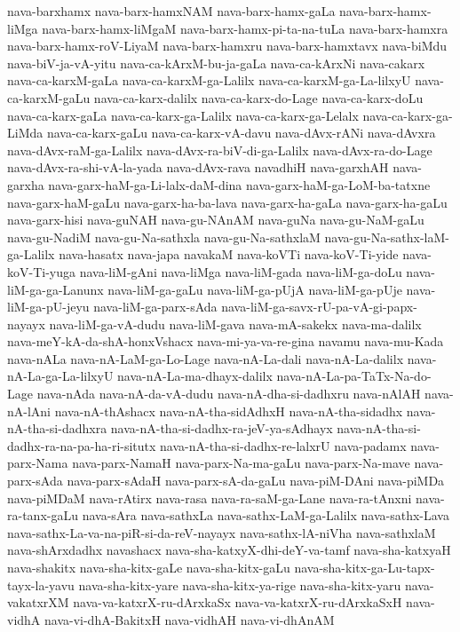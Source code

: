 {nava-barxhamx
nava-barx-hamxNAM
nava-barx-hamx-gaLa
nava-barx-hamx-liMga
nava-barx-hamx-liMgaM
nava-barx-hamx-pi-ta-na-tuLa
nava-barx-hamxra
nava-barx-hamx-roV-LiyaM
nava-barx-hamxru
nava-barx-hamxtavx
nava-biMdu
nava-biV-ja-vA-yitu
nava-ca-kArxM-bu-ja-gaLa
nava-ca-kArxNi
nava-cakarx
nava-ca-karxM-gaLa
nava-ca-karxM-ga-Lalilx
nava-ca-karxM-ga-La-lilxyU
nava-ca-karxM-gaLu
nava-ca-karx-dalilx
nava-ca-karx-do-Lage
nava-ca-karx-doLu
nava-ca-karx-gaLa
nava-ca-karx-ga-Lalilx
nava-ca-karx-ga-Lelalx
nava-ca-karx-ga-LiMda
nava-ca-karx-gaLu
nava-ca-karx-vA-davu
nava-dAvx-rANi
nava-dAvxra
nava-dAvx-raM-ga-Lalilx
nava-dAvx-ra-biV-di-ga-Lalilx
nava-dAvx-ra-do-Lage
nava-dAvx-ra-shi-vA-la-yada
nava-dAvx-rava
navadhiH
nava-garxhAH
nava-garxha
nava-garx-haM-ga-Li-lalx-daM-dina
nava-garx-haM-ga-LoM-ba-tatxne
nava-garx-haM-gaLu
nava-garx-ha-ba-lava
nava-garx-ha-gaLa
nava-garx-ha-gaLu
nava-garx-hisi
nava-guNAH
nava-gu-NAnAM
nava-guNa
nava-gu-NaM-gaLu
nava-gu-NadiM
nava-gu-Na-sathxla
nava-gu-Na-sathxlaM
nava-gu-Na-sathx-laM-ga-Lalilx
nava-hasatx
nava-japa
navakaM
nava-koVTi
nava-koV-Ti-yide
nava-koV-Ti-yuga
nava-liM-gAni
nava-liMga
nava-liM-gada
nava-liM-ga-doLu
nava-liM-ga-ga-Lanunx
nava-liM-ga-gaLu
nava-liM-ga-pUjA
nava-liM-ga-pUje
nava-liM-ga-pU-jeyu
nava-liM-ga-parx-sAda
nava-liM-ga-savx-rU-pa-vA-gi-papx-nayayx
nava-liM-ga-vA-dudu
nava-liM-gava
nava-mA-sakekx
nava-ma-dalilx
nava-meY-kA-da-shA-honxVshacx
nava-mi-ya-va-re-gina
navamu
nava-mu-Kada
nava-nALa
nava-nA-LaM-ga-Lo-Lage
nava-nA-La-dali
nava-nA-La-dalilx
nava-nA-La-ga-La-lilxyU
nava-nA-La-ma-dhayx-dalilx
nava-nA-La-pa-TaTx-Na-do-Lage
nava-nAda
nava-nA-da-vA-dudu
nava-nA-dha-si-dadhxru
nava-nAlAH
nava-nA-lAni
nava-nA-thAshacx
nava-nA-tha-sidAdhxH
nava-nA-tha-sidadhx
nava-nA-tha-si-dadhxra
nava-nA-tha-si-dadhx-ra-jeV-ya-sAdhayx
nava-nA-tha-si-dadhx-ra-na-pa-ha-ri-situtx
nava-nA-tha-si-dadhx-re-lalxrU
nava-padamx
nava-parx-Nama
nava-parx-NamaH
nava-parx-Na-ma-gaLu
nava-parx-Na-mave
nava-parx-sAda
nava-parx-sAdaH
nava-parx-sA-da-gaLu
nava-piM-DAni
nava-piMDa
nava-piMDaM
nava-rAtirx
nava-rasa
nava-ra-saM-ga-Lane
nava-ra-tAnxni
nava-ra-tanx-gaLu
nava-sAra
nava-sathxLa
nava-sathx-LaM-ga-Lalilx
nava-sathx-Lava
nava-sathx-La-va-na-piR-si-da-reV-nayayx
nava-sathx-lA-niVha
nava-sathxlaM
nava-shArxdadhx
navashacx
nava-sha-katxyX-dhi-deY-va-tamf
nava-sha-katxyaH
nava-shakitx
nava-sha-kitx-gaLe
nava-sha-kitx-gaLu
nava-sha-kitx-ga-Lu-tapx-tayx-la-yavu
nava-sha-kitx-yare
nava-sha-kitx-ya-rige
nava-sha-kitx-yaru
nava-vakatxrXM
nava-va-katxrX-ru-dArxkaSx
nava-va-katxrX-ru-dArxkaSxH
nava-vidhA
nava-vi-dhA-BakitxH
nava-vidhAH
nava-vi-dhAnAM
}
